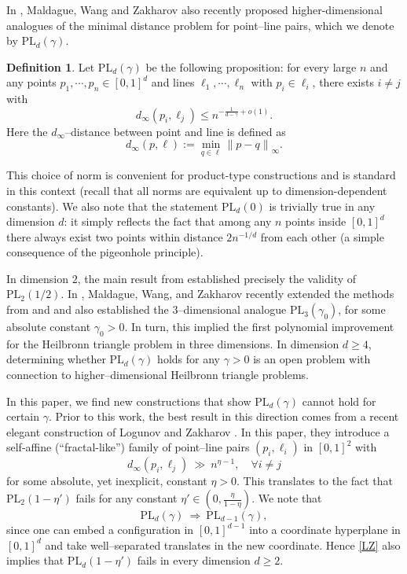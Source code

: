 \documentclass[12pt,reqno]{amsart}
\theoremstyle{plain}
\theoremstyle{definition}
\newtheorem{definition}[theorem]{Definition}
\newcommand{\PL}{\mathrm{PL}}
\newcommand{\1}{\mathbf{1}}
\begin{document}
In \cite{maldague2025heilbronn}, Maldague, Wang and Zakharov also recently proposed higher-dimensional analogues of the minimal distance problem for point--line pairs, which we denote by $\PL_d(\gamma)$. 
\begin{definition}
    Let $\PL_d(\gamma)$ be the following proposition: for every large $n$ and any points $p_1, \cdots, p_n \in [0, 1]^d$ and lines $\ell_1, \cdots, \ell_n$ with $p_i \in \ell_i$, there exists $i \neq j$ with 
    $$d_\infty(p_i, \ell_j) \leq n^{-\frac{1}{d-\gamma} + o(1)}.$$
    Here the $d_{\infty}$--distance between point and line is defined as
    $$d_\infty(p, \ell) := \min_{q \in \ell} \lVert{p - q \rVert}_\infty.$$
\end{definition}
This choice of norm is convenient for product-type constructions and is standard in this context (recall that all norms are equivalent up to dimension-dependent constants). We also note that the statement $\PL_d(0)$ is trivially true in any dimension $d$: it simply reflects the fact that among any $n$ points inside $[0,1]^d$ there always exist two points within distance $2n^{-1/d}$ from each other (a simple consequence of the pigeonhole principle). 

In dimension $2$, the main result from \cite{CPZ} established precisely the validity of $\PL_2(1/2)$. In \cite{maldague2025heilbronn}, Maldague, Wang, and Zakharov recently extended the methods from \cite{CPZ0} and \cite{CPZ} and also established the $3$--dimensional analogue $\PL_3(\gamma_0)$, for some absolute constant $\gamma_0>0$. In turn, this implied the first polynomial improvement for the Heilbronn triangle problem in three dimensions. In dimension $d \geq 4$, determining whether $\PL_d(\gamma)$ holds for any $\gamma > 0$ is an open problem with connection to higher--dimensional Heilbronn triangle problems.

In this paper, we find new constructions that show $\PL_d(\gamma)$ cannot hold for certain $\gamma$. Prior to this work, the best result in this direction comes from a recent elegant construction of Logunov and Zakharov \cite{LogunovZakharov2025Fractal}. In this paper, they introduce a self-affine (``fractal-like'') family of point--line pairs $(p_i, \ell_i)$ in $[0,1]^2$ with
\begin{equation} \label{LZ} 
  d_{\infty}(p_i, \ell_j)\ \gg\ n^{\eta -1}, \quad \forall i \neq j
\end{equation}
for some absolute, yet inexplicit, constant $\eta >0$. This translates to the fact that $\PL_2(1-\eta')$ fails for any constant $\eta' \in (0, \frac{\eta}{1 - \eta})$. We note that
\begin{equation} \label{eq:PLrelation}
  \PL_d(\gamma)\ \Longrightarrow\ \PL_{d-1}(\gamma),
\end{equation}
since one can embed a configuration in $[0, 1]^{d - 1}$ into a coordinate hyperplane in $[0,1]^d$ and take well--separated translates in the new coordinate. Hence \eqref{LZ} also implies that $\PL_d(1 - \eta')$ fails in every dimension $d \geq 2$.
\end{document}
